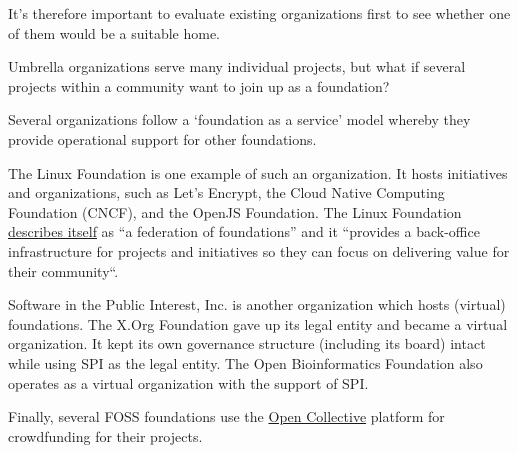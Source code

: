 It's therefore important to evaluate existing organizations first to see whether one of them would be a suitable home.

\begin{kaobox}[frametitle=Foundation as a service]

Umbrella organizations serve many individual projects, but what if several projects within a community want to join up as a foundation?

Several organizations follow a `foundation as a service' model whereby they provide operational support for other foundations.

The Linux Foundation is one example of such an organization.  It hosts initiatives and organizations, such as Let's Encrypt, the Cloud Native Computing Foundation (CNCF), and the OpenJS Foundation.  The Linux Foundation \href{https://www.linuxfoundation.org/join}{describes itself} as ``a federation of foundations'' and it ``provides a back-office infrastructure for projects and initiatives so they can focus on delivering value for their community``.

Software in the Public Interest, Inc. is another organization which hosts (virtual) foundations.  The X.Org Foundation gave up its legal entity and became a virtual organization.  It kept its own governance structure (including its board) intact while using SPI as the legal entity.  The Open Bioinformatics Foundation also operates as a virtual organization with the support of SPI.

Finally, several FOSS foundations use the \href{https://opencollective.com/}{Open Collective} platform for crowdfunding for their projects.

\end{kaobox}

